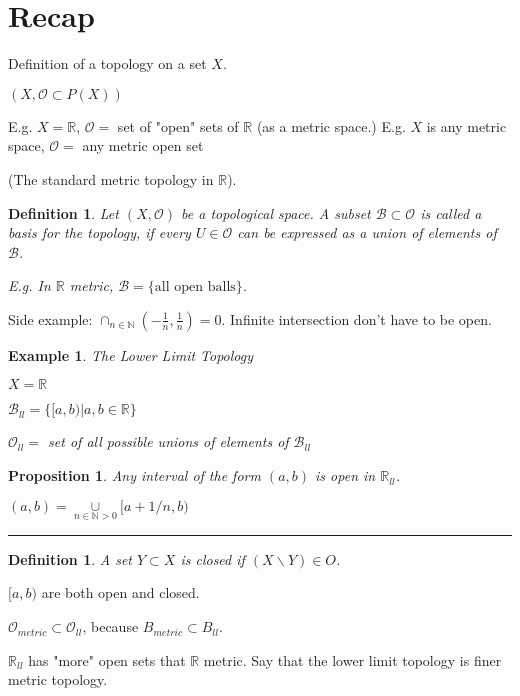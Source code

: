 \documentclass[twoside]{article}
\newcommand{\N}{\mathbb{N}}
\newcommand{\TO}{\mathcal O}
\newtheorem{proposition}[theorem]{Proposition}
\newtheorem{definition}[theorem]{Definition}
\newtheorem{example}[theorem]{Example}
\newenvironment{proof}{{\bf Proof:}}{\hfill\rule{2mm}{2mm}}
\newcommand\R{\mathbb{R}}
\begin{document}
    \section{Recap}
    Definition of a topology on a set $X$. 

    $(X,\mathcal O \subset P(X))$

    E.g. $X = \R$, $\TO = $ set of "open" sets of $\R$ (as a metric space.)
    E.g. $X $ is any metric space, $\TO = $ any metric open set

    (The standard metric topology in $\R$). 

    \begin{definition}
        Let $(X, \mathcal O)$ be a topological space. A subset $\mathcal B \subset \mathcal O$ is called a basis for the topology, if every $U \in \TO$ can be expressed as a union of elements of $\mathcal B$. 

        E.g. In $\R$ metric, $\mathcal B = \{\text{all open balls}\}$.
    \end{definition}

    Side example: $\cap_{n \in \N}(-\frac1n, \frac1n)= {0}$. Infinite intersection don't have to be open. 

    \begin{example}{The Lower Limit Topology}


        $X = \R$

        $\mathcal B_{ll} = \{[a,b) \vert a, b \in \R\}$

        $\TO_{ll} = $ set of all possible unions of elements of $\mathcal B_{ll}$
    \end{example}

    \begin{proposition}
        Any interval of the form $(a,b)$ is open in $\R_{ll}$. 
    \end{proposition}

    \begin{proof}
        $(a,b) = \underset{n\in \N>0}\cup[a+1/n, b)$
    \end{proof}

    \begin{definition}
        A set $Y \subset X$ is closed if $(X\backslash Y) \in O$.
    \end{definition}


    $[a,b)$ are both open and closed. 

    $\TO_{metric} \subset \TO_{ll}$, because $B_{metric} \subset B_{ll}$. 

    $\R_{ll}$ has "more" open sets that $\R $ metric. Say that the lower limit topology is finer metric topology. 
\end{document}
